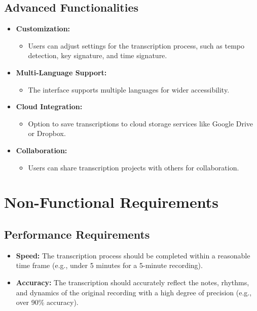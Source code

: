 \documentclass{article}
\begin{document}
\subsection{Advanced Functionalities}
\begin{itemize}
    \item \textbf{Customization:}
    \begin{itemize}
        \item Users can adjust settings for the transcription process, such as tempo detection, key signature, and time signature.
    \end{itemize}
    \item \textbf{Multi-Language Support:}
    \begin{itemize}
        \item The interface supports multiple languages for wider accessibility.
    \end{itemize}
    \item \textbf{Cloud Integration:}
    \begin{itemize}
        \item Option to save transcriptions to cloud storage services like Google Drive or Dropbox.
    \end{itemize}
    \item \textbf{Collaboration:}
    \begin{itemize}
        \item Users can share transcription projects with others for collaboration.
    \end{itemize}
\end{itemize}

\section{Non-Functional Requirements}

\subsection{Performance Requirements}
\begin{itemize}
    \item \textbf{Speed:} The transcription process should be completed within a reasonable time frame (e.g., under 5 minutes for a 5-minute recording).
    \item \textbf{Accuracy:} The transcription should accurately reflect the notes, rhythms, and dynamics of the original recording with a high degree of precision (e.g., over 90\% accuracy).
\end{itemize}
\end{document}
